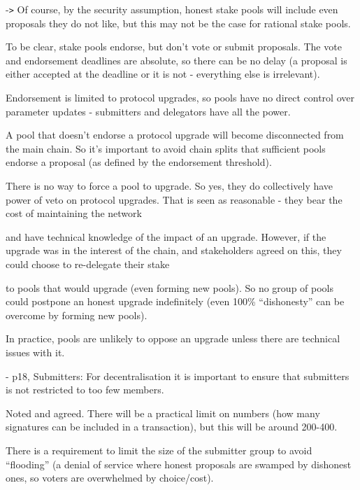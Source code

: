 \parindent=18pt
-\texttt{>}  Of course, by the security assumption, honest stake pools will include 
even proposals they do not like, but this may not be the case for rational stake 
pools.

\vspace{12pt}
\parindent=0pt
{\color{color02} To be clear, stake pools endorse, but don't vote or submit proposals. 
 The vote and endorsement deadlines are absolute, so there can be no delay (a proposal 
is either accepted at the deadline or it is not - everything else is irrelevant).}

{\color{color02} Endorsement is limited to protocol upgrades, so pools have no 
direct control over parameter updates - submitters and delegators have all the 
power.  }

\vspace{12pt}
{\color{color02} A pool that doesn't endorse a protocol upgrade will become disconnected 
from the main chain.  So it's important to avoid chain splits that sufficient pools 
endorse a proposal (as defined by the endorsement threshold).  }

{\color{color02} There is no way to force a pool to upgrade.  So yes, they do collectively 
have power of veto on protocol upgrades.  That is seen as reasonable - they bear 
the cost of maintaining the network}

{\color{color02} and have technical knowledge of the impact of an upgrade.  However, 
if the upgrade was in the interest of the chain, and stakeholders agreed on this, 
they could choose to re-delegate their stake}

{\color{color02} to pools that would upgrade (even forming new pools).  So no group 
of pools could postpone an honest upgrade indefinitely (even 100\% ``dishonesty'' 
can be overcome by forming new pools).}

\vspace{12pt}
{\color{color02} In practice, pools are unlikely to oppose an upgrade unless there 
are technical issues with it.}

\vspace{12pt}
- p18, Submitters: For decentralisation it is important to ensure that submitters 
is not restricted to too few members.

\vspace{12pt}
{\color{color02} Noted and agreed.  There will be a practical limit on numbers 
(how many signatures can be included in a transaction), but this will be around 
200-400.}

{\color{color02} There is a requirement to limit the size of the submitter group 
to avoid ``flooding'' (a denial of service where honest proposals are swamped by 
dishonest ones, so voters are overwhelmed by choice/cost).}

